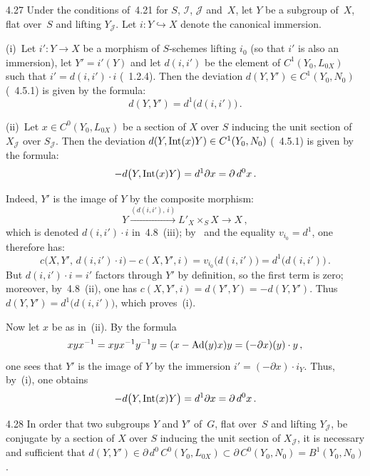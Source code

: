 \begin{lemma}{4.27}\label{III.4.27}
Under the conditions of~4.21 for \(S\), \(\mathcal{I}\), \(\mathcal{J}\)
and~\(X\), let \(Y\) be a subgroup of~\(X\), flat over~\(S\) and lifting
\(Y_{\mathcal{J}}\). Let \(i\colon Y\hookrightarrow X\) denote the canonical
immersion.%
{\renewcommand{\thefootnote}{(125)}}

(i)~Let \(i'\colon Y\to X\) be a morphism of \(S\)-schemes lifting \(i_{0}\)
(so that \(i'\) is also an immersion), let \(Y'=i'(Y)\) and let \(d(i,i')\) be
the element of \(C^{1}(Y_{0},L_{0X})\) such that \(i'=d(i,i')\cdot i\)
(\cf~1.2.4). Then the deviation \(d(Y,Y')\in C^{1}(Y_{0},N_{0})\)
(\cf~4.5.1) is given by the formula:
\[
d(Y,Y')=d^{1}\bigl(d(i,i')\bigr)\,.
\]

(ii)~Let \(x\in C^{0}(Y_{0},L_{0X})\) be a section of \(X\) over \(S\) inducing
the unit section of \(X_{\mathcal{J}}\) over \(S_{\mathcal{J}}\). Then the
deviation \(d(Y,\operatorname{Int}(x)Y)\in C^{1}(Y_{0},N_{0})\) (\cf~4.5.1) is given by the
formula:
\[
-d\bigl(Y,\operatorname{Int}(x)Y\bigr)=d^{1}\partial x=\partial\,d^{0}x\,.
\]
\end{lemma}

Indeed, \(Y'\) is the image of \(Y\) by the composite morphism:%
{\renewcommand{\thefootnote}{(126)}}
\[
Y\xrightarrow{(d(i,i'),\,i)}L'_{X}\times_{S}X\longrightarrow X\,,
\]
which is denoted \(d(i,i')\cdot i\) in~4.8~(iii); by \loccit\ and the equality
\(v_{i_{0}}=d^{1}\), one therefore has:
\[
c\bigl(X,Y',\,d(i,i')\cdot i\bigr)-c(X,Y',i)
=
v_{i_{0}}\bigl(d(i,i')\bigr)
=
d^{1}\bigl(d(i,i')\bigr)\,.
\]
But \(d(i,i')\cdot i=i'\) factors through \(Y'\) by definition, so the first
term is zero; moreover, by~4.8~(ii), one has
\(c(X,Y',i)=d(Y',Y)=-d(Y,Y')\). Thus
\(d(Y,Y')=d^{1}\bigl(d(i,i')\bigr)\), which proves~(i).

Now let \(x\) be as in~(ii). By the formula
\[
xyx^{-1}=xyx^{-1}y^{-1}y=(x-\operatorname{Ad}(y)x)y=(-\partial x)(y)\cdot y\,,
\]
one sees that \(Y'\) is the image of \(Y\) by the immersion
\(i'=(-\partial x)\cdot i_{Y}\). Thus, by~(i), one obtains
\[
-d\bigl(Y,\operatorname{Int}(x)Y\bigr)=d^{1}\partial x=\partial\,d^{0}x\,.
\]

\begin{corollary}{4.28}\label{III.4.28}
In order that two subgroups \(Y\) and \(Y'\) of~\(G\), flat over~\(S\) and
lifting \(Y_{\mathcal{J}}\), be conjugate by a section of \(X\) over \(S\)
inducing the unit section of \(X_{\mathcal{J}}\), it is necessary and
sufficient that
\(d(Y,Y')\in\partial\,d^{0}\,C^{0}(Y_{0},L_{0X})
\subset\partial\,C^{0}(Y_{0},N_{0})=B^{1}(Y_{0},N_{0})\).
\end{corollary}

